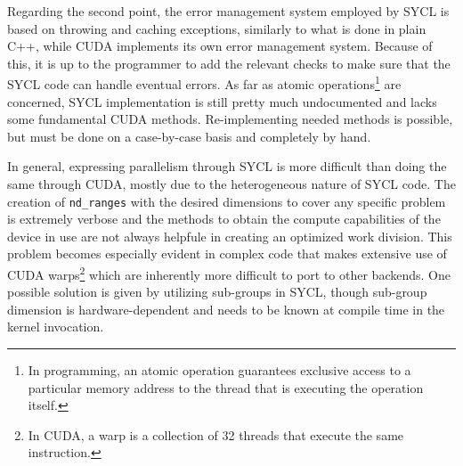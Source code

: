 Regarding the second point, the error management system employed by SYCL is based on throwing and caching exceptions, similarly to what is done in plain C++, while CUDA implements its own error management system. Because of this, it is up to the programmer to add the relevant checks to make sure that the SYCL code can handle eventual errors. As far as atomic operations\footnote{In programming, an atomic operation guarantees exclusive access to a particular memory address to the thread that is executing the operation itself.} are concerned, SYCL implementation is still pretty much undocumented and lacks some fundamental CUDA methods. Re-implementing needed methods is possible, but must be done on a case-by-case basis and completely by hand. 

In general, expressing parallelism through SYCL is more difficult than doing the same through CUDA, mostly due to the heterogeneous nature of SYCL code. The creation of \Verb "nd_ranges" with the desired dimensions to cover any specific problem is extremely verbose and the methods to obtain the compute capabilities of the device in use are not always helpfule in creating an optimized work division. This problem becomes especially evident in complex code that makes extensive use of CUDA warps\footnote{In CUDA, a warp is a collection of 32 threads that execute the same instruction.} which are inherently more difficult to port to other backends. One possible solution is given by utilizing sub-groups in SYCL, though sub-group dimension is hardware-dependent and needs to be known at compile time in the kernel invocation.
